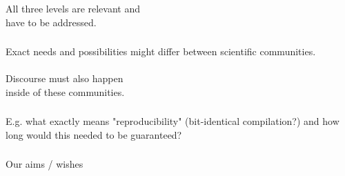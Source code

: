 \documentclass{beamer}
\begin{document}
\begin{frame}
  \frametitle{}
  \begin{block}{}
    \begin{center}
      All three levels are relevant and\\have to be addressed.
    \end{center}
  \end{block}
\end{frame}


\begin{frame}
  \frametitle{}
  \begin{block}{}
    \begin{center}
      Exact needs and possibilities might differ between scientific
      communities.\\\ \\
      Discourse must also happen\\inside of these  communities.
    \end{center}
  \end{block}
\end{frame}

\begin{frame}
  \frametitle{}
  \begin{block}{}
    \begin{center}
      E.g. what exactly means "reproducibility" (bit-identical
      compilation?) and how long would this needed to be guaranteed?
    \end{center}
  \end{block}
\end{frame}

\begin{frame}
  \frametitle{}
  \begin{block}{}
    \begin{center}
      Our aims / wishes
    \end{center}
  \end{block}
\end{frame}
\end{document}

